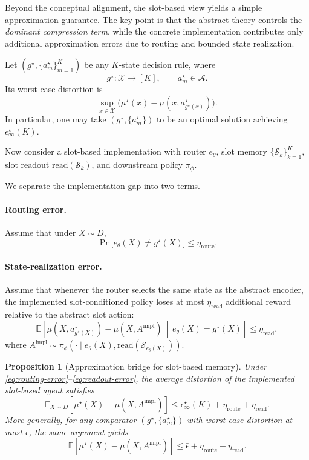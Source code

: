 \documentclass{article}
\theoremstyle{plain}
\newtheorem{proposition}{Proposition}
\theoremstyle{definition}
\theoremstyle{remark}
\newcommand{\cA}{\mathcal{A}}
\newcommand{\cX}{\mathcal{X}}
\newcommand{\eps}{\epsilon}
\newcommand{\EE}{\mathbb{E}}
\newcommand{\MemRead}{\mathrm{read}}
\begin{document}
Beyond the conceptual alignment, the slot-based view yields a simple approximation guarantee.
The key point is that the abstract theory controls the \emph{dominant compression term}, while the concrete implementation contributes only additional approximation errors due to routing and bounded state realization.

Let $(g^\star,\{a_m^\star\}_{m=1}^K)$ be any $K$-state decision rule, where
\[
g^\star:\cX\to[K], \qquad a_m^\star\in\cA.
\]
Its worst-case distortion is
\[
\sup_{x\in\cX}\bigl(\mu^\star(x)-\mu(x,a_{g^\star(x)}^\star)\bigr).
\]
In particular, one may take $(g^\star,\{a_m^\star\})$ to be an optimal solution achieving $\eps^\star_\infty(K)$.

Now consider a slot-based implementation with router $e_\theta$, slot memory $\{\mathcal S_k\}_{k=1}^K$, slot readout $\MemRead(\mathcal S_k)$, and downstream policy $\pi_\phi$.

We separate the implementation gap into two terms.

\paragraph{Routing error.}
Assume that under $X\sim D$,
\begin{equation}
\label{eq:routing-error}
\Pr\!\big[e_\theta(X)\neq g^\star(X)\big] \le \eta_{\mathrm{route}} .
\end{equation}

\paragraph{State-realization error.}
Assume that whenever the router selects the same state as the abstract encoder, the implemented slot-conditioned policy loses at most $\eta_{\mathrm{read}}$ additional reward relative to the abstract slot action:
\begin{equation}
\label{eq:readout-error}
\EE\!\left[\mu\!\left(X,a_{g^\star(X)}^\star\right) - \mu\!\left(X,A^{\mathrm{impl}}\right)\,\middle|\, e_\theta(X)=g^\star(X)\right]
\le
\eta_{\mathrm{read}},
\end{equation}
where $A^{\mathrm{impl}}\sim \pi_\phi\!\left(\cdot \mid e_\theta(X), \MemRead(\mathcal S_{e_\theta(X)})\right)$.

\begin{proposition}[Approximation bridge for slot-based memory]
\label{prop:bridge}
Under \eqref{eq:routing-error}--\eqref{eq:readout-error}, the average distortion of the implemented slot-based agent satisfies
\begin{equation}
\label{eq:bridge-bound}
\EE_{X\sim D}\!\left[\mu^\star(X)-\mu\!\left(X,A^{\mathrm{impl}}\right)\right]
\le
\eps^\star_\infty(K) + \eta_{\mathrm{route}} + \eta_{\mathrm{read}} .
\end{equation}
More generally, for any comparator $(g^\star,\{a_m^\star\})$ with worst-case distortion at most $\bar\eps$, the same argument yields
\[
\EE\!\left[\mu^\star(X)-\mu\!\left(X,A^{\mathrm{impl}}\right)\right]
\le
\bar\eps + \eta_{\mathrm{route}} + \eta_{\mathrm{read}}.
\]
\end{proposition}
\end{document}
